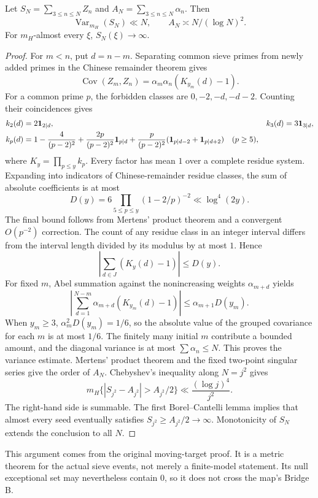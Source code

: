 \begin{theorem}\label{thm:haar}
Let $S_N=\sum_{3\le n\le N}Z_n$ and $A_N=\sum_{3\le n\le N}\alpha_n$. Then
\[
\operatorname{Var}_{m_H}(S_N)\ll N,\qquad A_N\asymp N/(\log N)^2.
\]
For $m_H$-almost every $\xi$, $S_N(\xi)\to\infty$.
\end{theorem}
\begin{proof}
For $m<n$, put $d=n-m$. Separating common sieve primes from newly added primes in the Chinese remainder theorem gives
\[
\operatorname{Cov}(Z_m,Z_n)=\alpha_m\alpha_n(K_{y_m}(d)-1).
\]
For a common prime $p$, the forbidden classes are $0,-2,-d,-d-2$. Counting their coincidences gives
\begin{align*}
k_2(d)&=2\mathbf 1_{2\mid d},&k_3(d)&=3\mathbf 1_{3\mid d},\\
k_p(d)&=1-\frac4{(p-2)^2}+\frac{2p}{(p-2)^2}\mathbf 1_{p\mid d}
+\frac p{(p-2)^2}(\mathbf 1_{p\mid d-2}+\mathbf 1_{p\mid d+2})\quad(p\ge5),
\end{align*}
where $K_y=\prod_{p\le y}k_p$. Every factor has mean $1$ over a complete residue system.
Expanding into indicators of Chinese-remainder residue classes, the sum of absolute coefficients is at most
\[
D(y)=6\prod_{5\le p\le y}(1-2/p)^{-2}\ll\log^4(2y).
\]
The final bound follows from Mertens' product theorem and a convergent $O(p^{-2})$ correction.
The count of any residue class in an integer interval differs from the interval length divided by its modulus by at most $1$. Hence
\[
\left|\sum_{d\in J}(K_y(d)-1)\right|\le D(y).
\]
For fixed $m$, Abel summation against the nonincreasing weights $\alpha_{m+d}$ yields
\[
\left|\sum_{d=1}^{N-m}\alpha_{m+d}(K_{y_m}(d)-1)\right|
\le\alpha_{m+1}D(y_m).
\]
When $y_m\ge3$, $\alpha_m^2D(y_m)=1/6$, so the absolute value of the grouped covariance for each $m$ is at most $1/6$.
The finitely many initial $m$ contribute a bounded amount, and the diagonal variance is at most $\sum\alpha_n\le N$. This proves the variance estimate.
Mertens' product theorem and the fixed two-point singular series give the order of $A_N$.
Chebyshev's inequality along $N=j^2$ gives
\[
m_H\{|S_{j^2}-A_{j^2}|>A_{j^2}/2\}\ll\frac{(\log j)^4}{j^2}.
\]
The right-hand side is summable. The first Borel--Cantelli lemma implies that almost every seed eventually satisfies $S_{j^2}\ge A_{j^2}/2\to\infty$. Monotonicity of $S_N$ extends the conclusion to all $N$.
\end{proof}
This argument comes from the original moving-target proof\cite{archivedynamics}. It is a metric theorem for the actual sieve events, not merely a finite-model statement.
Its null exceptional set may nevertheless contain $0$, so it does not cross the map's Bridge B.

